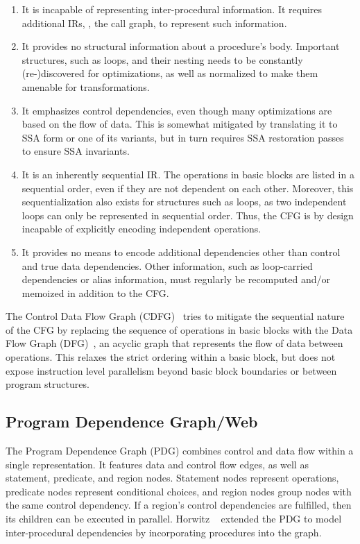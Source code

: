 \begin{enumerate}
	\item It is incapable of representing inter-procedural information. It requires additional IRs,
		\eg, the call graph, to represent such information.

	\item It provides no structural information about a procedure's body. Important structures, such
		as loops, and their nesting needs to be constantly (re-)discovered for optimizations, as well
		as normalized to make them amenable for transformations.

	\item It emphasizes control dependencies, even though many optimizations are based on the flow
		of data. This is somewhat mitigated by translating it to SSA form or one of its variants, but
		in turn requires SSA restoration passes~\cite{Choi96} to ensure SSA invariants.

	\item It is an inherently sequential IR. The operations in basic blocks are listed in a
		sequential order, even if they are not dependent on each other. Moreover, this
		sequentialization also exists for structures such as loops, as two independent loops can only
		be represented in sequential order. Thus, the CFG is by design incapable of explicitly
		encoding independent operations.

	\item It provides no means to encode additional dependencies other than control and true data
		dependencies. Other information, such as loop-carried dependencies or alias information, must
		regularly be recomputed and/or memoized in addition to the CFG.
\end{enumerate}

The Control Data Flow Graph (CDFG)~\cite{Namballa04} tries to mitigate the sequential nature of
the CFG by replacing the sequence of operations in basic blocks with the Data Flow
Graph (DFG)~\cite{Dennis80}, an acyclic graph that represents the flow of data between operations.
This relaxes the strict ordering within a basic block, but does not expose instruction level
parallelism beyond basic block boundaries or between program structures.

\subsection{Program Dependence Graph/Web}
The Program Dependence Graph (PDG) \cite{Ferrante87,Horwitz288} combines control and data flow
within a single representation. It features data and control flow edges, as well as statement,
predicate, and region nodes. Statement nodes represent operations, predicate nodes represent
conditional choices, and region nodes group nodes with the same control dependency. If a
region's control dependencies are fulfilled, then its children can be executed in
parallel. Horwitz \etal~\cite{Horwitz88} extended the PDG to model inter-procedural dependencies
by incorporating procedures into the graph.


